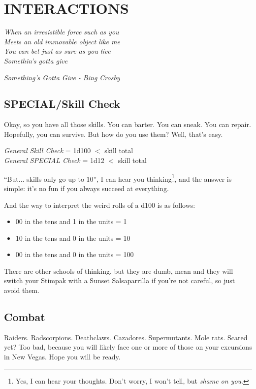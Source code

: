 
\section{INTERACTIONS}

\epigraph{\textit{When an irresistible force such as you \\
Meets an old immovable object like me \\
You can bet just as sure as you live \\
Somethin's gotta give}}{\textit{Something's Gotta Give - Bing Crosby}}

\subsection{SPECIAL/Skill Check}

Okay, so you have all those skills. You can barter. You can sneak. You can repair. Hopefully, you can survive. But how do you use them? Well, that's easy.

\begin{center}
	\textit{General Skill Check} = 1d100 $<$ skill total \\
	\textit{General SPECIAL Check} = 1d12 $<$ skill total
\end{center}

``But... skills only go up to 10'', I can hear you thinking\footnote{Yes, I can hear your thoughts. Don't worry, I won't tell, but \textit{shame on you}.}, and the answer is simple: it's no fun if you always succeed at everything. 

And the way to interpret the weird rolls of a d100 is as follows: 
\begin{itemize}
	\item 00 in the tens and 1 in the units = 1
	\item 10 in the tens and 0 in the units = 10
	\item 00 in the tens and 0 in the units = 100
\end{itemize}

There are other schools of thinking, but they are dumb, mean and they will switch your Stimpak with a Sunset Salsaparrilla if you're not careful, so just avoid them.

\subsection{Combat}

Raiders. Radscorpions. Deathclaws. Cazadores. Supermutants. Mole rats. Scared yet? Too bad, because you will likely face one or more of those on your excursions in New Vegas. Hope you will be ready.

